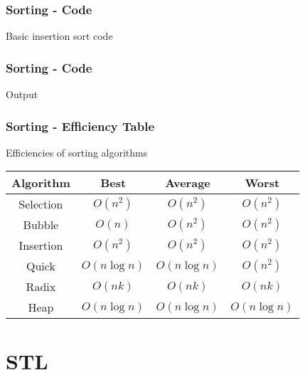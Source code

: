 \documentclass[c, aspectratio=169]{beamer}
\begin{document}
\begin{frame}\frametitle{Sorting - Code}
Basic insertion sort code

\end{frame}

\begin{frame}\frametitle{Sorting - Code}
Output

\end{frame}

\begin{frame}\end{frame}
\begin{frame}\end{frame}
\begin{frame}\end{frame}
\begin{frame}\end{frame}
\begin{frame}\end{frame}
\begin{frame}\end{frame}
\begin{frame}\end{frame}
\begin{frame}\end{frame}
\begin{frame}\end{frame}

\begin{frame}\frametitle{Sorting - Efficiency Table}
Efficiencies of sorting algorithms
\begin{center}
\begin{tabular}{|c|c|c|c|}
\hline Algorithm & Best & Average & Worst\\\hline
Selection & $O(n^2)$ & $O(n^2)$ & $O(n^2)$\\\hline
Bubble & $O(n)$ & $O(n^2)$ & $O(n^2)$\\\hline
Insertion & $O(n^2)$ & $O(n^2)$ & $O(n^2)$\\\hline
Quick & $O(n\log n)$ & $O(n\log n)$ & $O(n^2)$\\\hline
Radix & $O(nk)$ & $O(nk)$ & $O(nk)$\\\hline
Heap & $O(n\log n)$ & $O(n\log n)$ & $O(n\log n)$\\\hline
\end{tabular}
\end{center}
\end{frame}

\section{STL}
\begin{frame}\end{frame}
\begin{frame}\end{frame}
\begin{frame}\end{frame}
\end{document}
